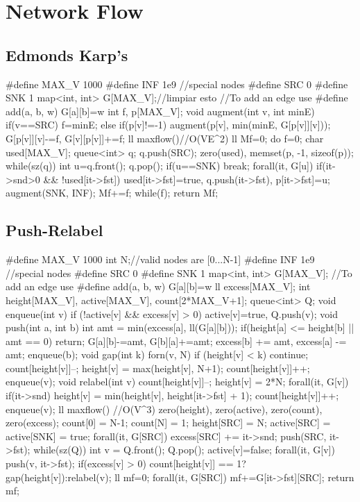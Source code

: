 \documentclass[10pt,landscape,twocolumn,a4paper,notitlepage]{article}
\begin{document}
\section{Network Flow}
\subsection{Edmonds Karp’s}
\begin{code}
#define MAX_V 1000
#define INF 1e9
//special nodes
#define SRC 0
#define SNK 1
map<int, int> G[MAX_V];//limpiar esto
//To add an edge use
#define add(a, b, w) G[a][b]=w
int f, p[MAX_V];
void augment(int v, int minE){
	if(v==SRC) f=minE;
	else if(p[v]!=-1){
		augment(p[v], min(minE, G[p[v]][v]));
		G[p[v]][v]-=f, G[v][p[v]]+=f;
	}
}
ll maxflow(){//O(VE^2)
	ll Mf=0;
	do{
		f=0;
		char used[MAX_V]; queue<int> q; q.push(SRC);
		zero(used), memset(p, -1, sizeof(p));
		while(sz(q)){
			int u=q.front(); q.pop();
			if(u==SNK) break;
			forall(it, G[u])
				if(it->snd>0 && !used[it->fst])
					used[it->fst]=true, q.push(it->fst), p[it->fst]=u;
		}
		augment(SNK, INF);
		Mf+=f;
	}while(f);
	return Mf;
}
\end{code}
\subsection{Push-Relabel}
\begin{code}
#define MAX_V 1000
int N;//valid nodes are [0...N-1]
#define INF 1e9
//special nodes
#define SRC 0
#define SNK 1
map<int, int> G[MAX_V];
//To add an edge use
#define add(a, b, w) G[a][b]=w
ll excess[MAX_V];
int height[MAX_V], active[MAX_V], count[2*MAX_V+1];
queue<int> Q;
void enqueue(int v) { 
	if (!active[v] && excess[v] > 0) active[v]=true, Q.push(v); }
void push(int a, int b) {
	int amt = min(excess[a], ll(G[a][b]));
	if(height[a] <= height[b] || amt == 0) return;
	G[a][b]-=amt, G[b][a]+=amt;
	excess[b] += amt, excess[a] -= amt;
	enqueue(b);
}
void gap(int k) {
	forn(v, N){
		if (height[v] < k) continue;
		count[height[v]]--;
		height[v] = max(height[v], N+1);
		count[height[v]]++;
		enqueue(v);
	}
}
void relabel(int v) {
	count[height[v]]--;
	height[v] = 2*N;
	forall(it, G[v])
		if(it->snd)
			height[v] = min(height[v], height[it->fst] + 1);
	count[height[v]]++;
	enqueue(v);
}
ll maxflow() {//O(V^3)
	zero(height), zero(active), zero(count), zero(excess);
	count[0] = N-1;
	count[N] = 1;
	height[SRC] = N;
	active[SRC] = active[SNK] = true;
	forall(it, G[SRC]){
		excess[SRC] += it->snd;
		push(SRC, it->fst);
	}
	while(sz(Q)) {
		int v = Q.front(); Q.pop();
		active[v]=false;
	forall(it, G[v]) push(v, it->fst);
	if(excess[v] > 0) 
		count[height[v]] == 1? gap(height[v]):relabel(v);
	}
	ll mf=0;
	forall(it, G[SRC]) mf+=G[it->fst][SRC];
	return mf;
}
\end{code}
\end{document}
